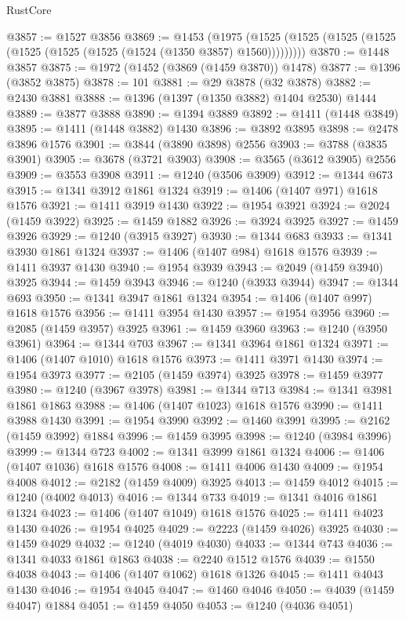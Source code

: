 \begin{lexlean}{RustCore}
\begin{coremodule}
@3857 := @1527 @3856
@3869 := @1453
    (@1975 (@1525 (@1525 (@1525 (@1525 (@1525 (@1525 (@1525 (@1524 (@1350 @3857) @1560)))))))))
@3870 := @1448 @3857
@3875 := @1972 (@1452 (@3869 (@1459 @3870)) @1478)
@3877 := @1396 (@3852 @3875)
@3878 := 101
@3881 := @29 @3878 (@32 @3878)
@3882 := @2430 @3881
@3888 := @1396 (@1397 (@1350 @3882) @1404 @2530) @1444
@3889 := @3877 @3888
@3890 := @1394 @3889
@3892 := @1411 (@1448 @3849)
@3895 := @1411 (@1448 @3882) @1430
@3896 := @3892 @3895
@3898 := @2478 @3896 @1576
@3901 := @3844 (@3890 @3898) @2556
@3903 := @3788 (@3835 @3901)
@3905 := @3678 (@3721 @3903)
@3908 := @3565 (@3612 @3905) @2556
@3909 := @3553 @3908
@3911 := @1240 (@3506 @3909)
@3912 := @1344 @673
@3915 := @1341 @3912 @1861 @1324
@3919 := @1406 (@1407 @971) @1618 @1576
@3921 := @1411 @3919 @1430
@3922 := @1954 @3921
@3924 := @2024 (@1459 @3922)
@3925 := @1459 @1882
@3926 := @3924 @3925
@3927 := @1459 @3926
@3929 := @1240 (@3915 @3927)
@3930 := @1344 @683
@3933 := @1341 @3930 @1861 @1324
@3937 := @1406 (@1407 @984) @1618 @1576
@3939 := @1411 @3937 @1430
@3940 := @1954 @3939
@3943 := @2049 (@1459 @3940) @3925
@3944 := @1459 @3943
@3946 := @1240 (@3933 @3944)
@3947 := @1344 @693
@3950 := @1341 @3947 @1861 @1324
@3954 := @1406 (@1407 @997) @1618 @1576
@3956 := @1411 @3954 @1430
@3957 := @1954 @3956
@3960 := @2085 (@1459 @3957) @3925
@3961 := @1459 @3960
@3963 := @1240 (@3950 @3961)
@3964 := @1344 @703
@3967 := @1341 @3964 @1861 @1324
@3971 := @1406 (@1407 @1010) @1618 @1576
@3973 := @1411 @3971 @1430
@3974 := @1954 @3973
@3977 := @2105 (@1459 @3974) @3925
@3978 := @1459 @3977
@3980 := @1240 (@3967 @3978)
@3981 := @1344 @713
@3984 := @1341 @3981 @1861 @1863
@3988 := @1406 (@1407 @1023) @1618 @1576
@3990 := @1411 @3988 @1430
@3991 := @1954 @3990
@3992 := @1460 @3991
@3995 := @2162 (@1459 @3992) @1884
@3996 := @1459 @3995
@3998 := @1240 (@3984 @3996)
@3999 := @1344 @723
@4002 := @1341 @3999 @1861 @1324
@4006 := @1406 (@1407 @1036) @1618 @1576
@4008 := @1411 @4006 @1430
@4009 := @1954 @4008
@4012 := @2182 (@1459 @4009) @3925
@4013 := @1459 @4012
@4015 := @1240 (@4002 @4013)
@4016 := @1344 @733
@4019 := @1341 @4016 @1861 @1324
@4023 := @1406 (@1407 @1049) @1618 @1576
@4025 := @1411 @4023 @1430
@4026 := @1954 @4025
@4029 := @2223 (@1459 @4026) @3925
@4030 := @1459 @4029
@4032 := @1240 (@4019 @4030)
@4033 := @1344 @743
@4036 := @1341 @4033 @1861 @1863
@4038 := @2240 @1512 @1576
@4039 := @1550 @4038
@4043 := @1406 (@1407 @1062) @1618 @1326
@4045 := @1411 @4043 @1430
@4046 := @1954 @4045
@4047 := @1460 @4046
@4050 := @4039 (@1459 @4047) @1884
@4051 := @1459 @4050
@4053 := @1240 (@4036 @4051)

\end{coremodule}
\end{lexlean}
